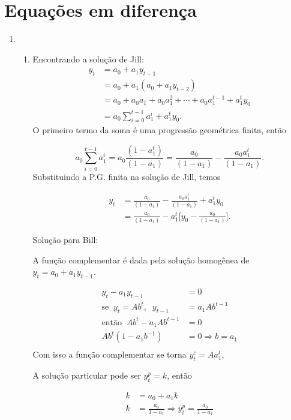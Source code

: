 \chapter{Equações em diferença}
\begin{enumerate}
	\item	
	\begin{enumerate}
		\item 
	 
	
	Encontrando a solução de Jill:
	\begin{align*}
		y_t&=a_0+a_1y_{t-1}\\
		&= a_0+a_1(a_0+a_1y_{t-2})\\
		&=a_0+a_0a_1+a_0a_1^2+\cdots+a_0a_1^{t-1}+a_1^ty_0\\
		&= a_0\sum_{i=0}^{t-1}a_1^{i}+a_1^ty_0.
	\end{align*}
	O primeiro termo da soma é uma progressão geométrica finita, então
	
	\begin{equation*}
		a_0\sum_{i=0}^{t-1}a_1^i=a_0\frac{(1-a_1^{t})}{(1-a_1)}=\frac{a_0}{(1-a_1)}-\frac{a_0a_1^{t}}{(1-a_1)}.
	\end{equation*}
	 Substituindo a P.G. finita na solução de Jill, temos
	
	\begin{align*}
		y_t&=\frac{a_0}{(1-a_1)}-\frac{a_0a_1^{t}}{(1-a_1)}+a_1^ty_0\\
		&=\frac{a_0}{(1-a_1)}-a_1^t\bigg[y_0-\frac{a_0}{(1-a_1)}\bigg].
	\end{align*}
	
	Solução para Bill:
		
	A função complementar é dada pela solução homogênea de $y_t=a_0+a_1y_{t-1}$.
	
	\begin{align*}
		y_t-a_1y_{t-1}&=0\\
		\text{se}\;\;y_t=Ab^t,\;\;y_{t-1}&=a_1Ab^{t-1}\\
		\text{então}\;\;Ab^t-a_1Ab^{t-1}&=0\\
		Ab^t({1-a_1b^{-1}})&=0 \Rightarrow b=a_1\\
	\end{align*}
	Com isso a função complementar se torna $y_t^c=Aa_1^t$, 
	
	A solução particular pode ser $y_t^p=k$, então
	
	\begin{align*}
	k&=a_0+a_1k\\
	k&=\frac{a_0}{1-a_1}\Rightarrow y^p_t=\frac{a_0}{1-a_1}
	\end{align*}
	

\end{enumerate}
\end{enumerate}
